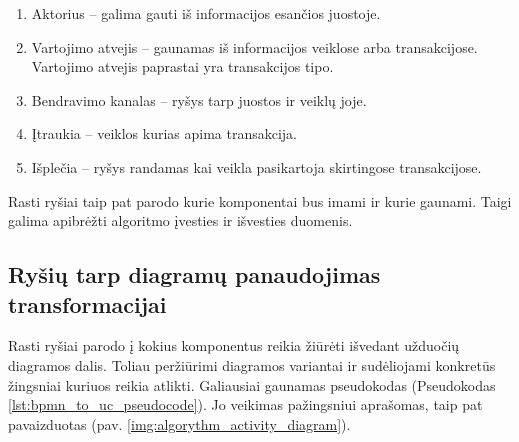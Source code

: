 \begin{enumerate}
	\item Aktorius – galima gauti iš informacijos esančios juostoje. 
	\item Vartojimo atvejis – gaunamas iš informacijos veiklose arba transakcijose. Vartojimo atvejis paprastai yra transakcijos tipo.
	\item Bendravimo kanalas – ryšys tarp juostos ir veiklų joje.
	\item Įtraukia – veiklos kurias apima transakcija.
	\item Išplečia – ryšys randamas kai veikla pasikartoja skirtingose transakcijose.
\end{enumerate} 

Rasti ryšiai taip pat parodo kurie komponentai bus imami ir kurie gaunami. Taigi galima apibrėžti algoritmo įvesties ir išvesties duomenis.


\subsection{Ryšių tarp diagramų panaudojimas transformacijai}

Rasti ryšiai parodo į kokius \BPMN komponentus reikia žiūrėti išvedant užduočių diagramos dalis. Toliau peržiūrimi diagramos variantai ir sudėliojami konkretūs žingsniai kuriuos reikia atlikti. Galiausiai gaunamas pseudokodas (Pseudokodas \ref{lst:bpmn_to_uc_pseudocode}). Jo veikimas pažingsniui aprašomas, taip pat pavaizduotas (pav. \ref{img:algorythm_activity_diagram}).

